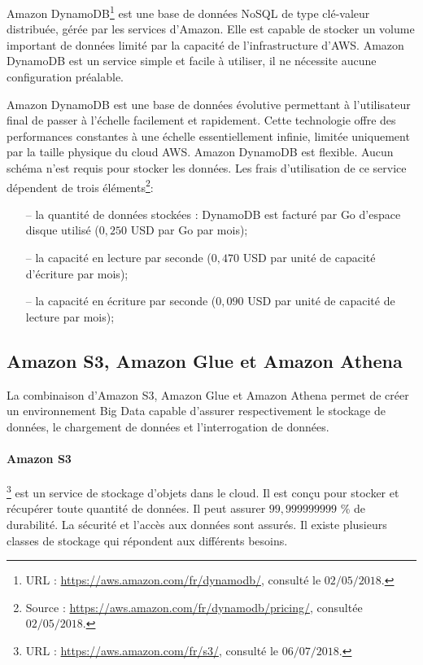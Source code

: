 	Amazon DynamoDB\footnote{URL : \url{https://aws.amazon.com/fr/dynamodb/}, consulté le $02/05/2018$.} est une base de données NoSQL de type clé-valeur distribuée, gérée par les services d'Amazon. Elle est capable de stocker un volume important de données limité par la capacité de l'infrastructure d'AWS. Amazon DynamoDB   est un service  simple et facile à utiliser,  il ne nécessite aucune configuration préalable. 
	
	Amazon DynamoDB  est une base de données évolutive permettant à l'utilisateur final de passer à l'échelle facilement et rapidement. Cette technologie offre des performances constantes à une échelle essentiellement infinie, limitée uniquement par la taille physique du cloud AWS. Amazon DynamoDB est flexible. Aucun schéma n'est requis pour stocker les données. Les frais d'utilisation de ce service dépendent de trois éléments\footnote{Source : \url{https://aws.amazon.com/fr/dynamodb/pricing/}, consultée $02/05/2018$.}:
	\begin{itemize}
		\item[--] la quantité de données stockées : DynamoDB est facturé par Go d'espace disque utilisé ($ 0,250 $ USD par Go par mois);
		\item[--] la capacité en lecture par seconde ($ 0,470 $ USD par unité de capacité d'écriture par mois);
		\item[--]  la capacité en écriture par seconde ($ 0,090 $ USD par unité de capacité de lecture par mois);
	\end{itemize}

\subsection{Amazon S3, Amazon Glue et Amazon Athena }

La combinaison d'Amazon S3, Amazon Glue et Amazon Athena permet de créer un environnement Big Data capable d'assurer respectivement le stockage de données, le chargement de données  et l'interrogation de données. 


\paragraph{Amazon S3}
\footnote{URL : \url{https://aws.amazon.com/fr/s3/}, consulté le $06/07/2018$.} est un service de stockage d'objets dans le cloud. Il est conçu pour stocker et  récupérer toute quantité de données. Il peut assurer $ 99,999999999 $ \% de durabilité. La sécurité  et l'accès aux données sont assurés. Il existe plusieurs classes de stockage qui répondent aux différents besoins. 

